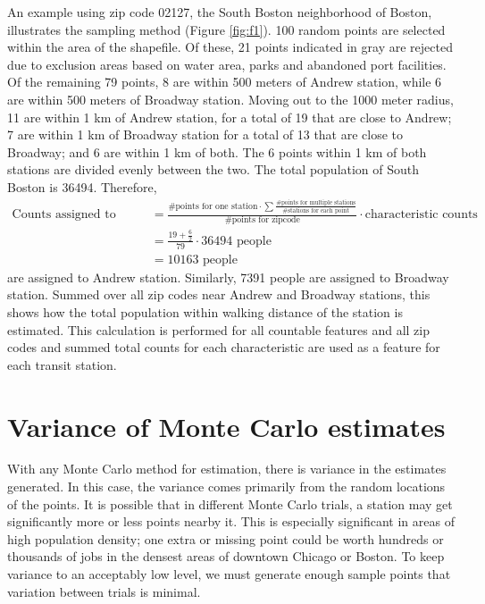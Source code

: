 \documentclass[11pt]{report}
\begin{document}
An example using zip code 02127, the South Boston neighborhood of Boston, illustrates the sampling method (Figure \ref{fig:f1}). 100 random points are selected within the area of the shapefile. Of these, 21 points indicated in gray are rejected due to exclusion areas based on water area, parks and abandoned port facilities. Of the remaining 79 points, 8 are within 500 meters of Andrew station, while 6 are within 500 meters of Broadway station. Moving out to the 1000 meter radius, 11 are within 1 km of Andrew station, for a total of 19 that are close to Andrew; 7 are within 1 km of Broadway station for a total of 13 that are close to Broadway; and 6 are within 1 km of both. The 6 points within 1 km of both stations are divided evenly between the two. The total population of South Boston is 36494. Therefore, 
\begin{align*}
\text{Counts assigned to station} &= \frac{\text{\# points for one station} \cdot \sum\frac{\text{\# points for multiple stations}}{\text{\# stations for each point}}}{\text{\# points for zipcode}}\cdot\text{characteristic counts}  \\
&= \frac{19 + \frac{6}{2}}{79}\cdot 36494 \text{ people} \\
&= 10163 \text{ people}
\end{align*}
are assigned to Andrew station. Similarly, 7391 people are assigned to Broadway station. Summed over all zip codes near Andrew and Broadway stations, this shows how the total population within walking distance of the station is estimated. This calculation is performed for all countable features and all zip codes and summed total counts for each characteristic are used as a feature for each transit station. 

\section{Variance of Monte Carlo estimates}

With any Monte Carlo method for estimation, there is variance in the estimates generated. In this case, the variance comes primarily from the random locations of the points. It is possible that in different Monte Carlo trials, a station may get significantly more or less points nearby it. This is especially significant in areas of high population density; one extra or missing point could be worth hundreds or thousands of jobs in the densest areas of downtown Chicago or Boston. To keep variance to an acceptably low level, we must generate enough sample points that variation between trials is minimal. 
\end{document}
